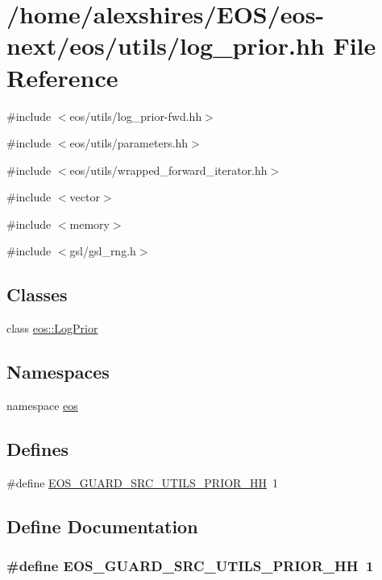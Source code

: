 \hypertarget{log__prior_8hh}{
\section{/home/alexshires/EOS/eos-\/next/eos/utils/log\_\-prior.hh File Reference}
\label{log__prior_8hh}
}
{\ttfamily \#include $<$eos/utils/log\_\-prior-\/fwd.hh$>$}\par
{\ttfamily \#include $<$eos/utils/parameters.hh$>$}\par
{\ttfamily \#include $<$eos/utils/wrapped\_\-forward\_\-iterator.hh$>$}\par
{\ttfamily \#include $<$vector$>$}\par
{\ttfamily \#include $<$memory$>$}\par
{\ttfamily \#include $<$gsl/gsl\_\-rng.h$>$}\par
\subsection*{Classes}
\begin{DoxyCompactItemize}
\item 
class \hyperlink{classeos_1_1LogPrior}{eos::LogPrior}
\end{DoxyCompactItemize}
\subsection*{Namespaces}
\begin{DoxyCompactItemize}
\item 
namespace \hyperlink{namespaceeos}{eos}
\end{DoxyCompactItemize}
\subsection*{Defines}
\begin{DoxyCompactItemize}
\item 
\#define \hyperlink{log__prior_8hh_ab7e0d02ec792882216ba5142846fb302}{EOS\_\-GUARD\_\-SRC\_\-UTILS\_\-PRIOR\_\-HH}~1
\end{DoxyCompactItemize}


\subsection{Define Documentation}
\hypertarget{log__prior_8hh_ab7e0d02ec792882216ba5142846fb302}{
\subsubsection[{EOS\_\-GUARD\_\-SRC\_\-UTILS\_\-PRIOR\_\-HH}]{\setlength{\rightskip}{0pt plus 5cm}\#define EOS\_\-GUARD\_\-SRC\_\-UTILS\_\-PRIOR\_\-HH~1}}
\label{log__prior_8hh_ab7e0d02ec792882216ba5142846fb302}
